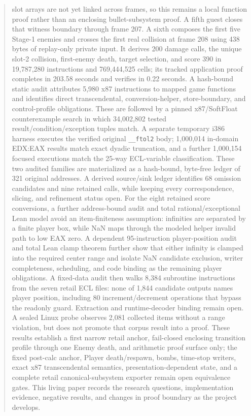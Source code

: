 \documentclass[10pt]{article}
\newcommand{\code}[1]{\texttt{#1}}
\begin{document}
\begin{abstract}
slot arrays are not yet linked across frames, so this remains a local function
proof rather than an enclosing bullet-subsystem proof.  A fifth guest closes
that witness boundary through frame 207.  A sixth composes the first five
Stage-1 enemies and crosses the first real collision at frame 208 using 438
bytes of replay-only private input.  It derives 200 damage calls, the unique
slot-2 collision, first-enemy death, target selection, and score 390 in
19,787,280 instructions and 769,444,525 cells; its tracked application proof
completes in 203.58 seconds and verifies in 0.22 seconds.  A
hash-bound static audit attributes 5,980 x87
instructions to mapped game functions and identifies direct transcendental,
conversion-helper, store-boundary, and control-profile obligations.  These
are followed by a pinned x87/SoftFloat counterexample search in which
34,002,802 tested result/condition/exception tuples match.  A separate
temporary i386 harness executes the verified original \code{\_\_ftol2} body;
1,000,014 in-domain EDX:EAX results match exact dyadic truncation, and a
further 1,000,154 focused executions match the 25-way ECL-variable
classification.  These two audited families are materialized as a hash-bound,
byte-free ledger of 321 original addresses.  A derived source/sink ledger
identifies 68 omission candidates and nine retained calls, while keeping every
correspondence, slicing, and refinement status open.
For the eight retained score conversions, a further address-bound audit and
total rational/exceptional Lean model avoid an item-finiteness assumption:
infinities are separated by a finite player box, while NaN maps through the
modeled helper invalid path to low EAX zero.  A dependent 95-instruction
player-position audit and total Lean clamp theorem further show that either
infinity is clamped into the required center range and isolate NaN candidate
exclusion, writer completeness, scheduling, and code binding as the remaining
player obligations.  A fixed-data audit then walks 8,384 subroutine
instructions from the seven retail ECL files: none of 1,844 candidate outputs
names player position,
including 80 increment/decrement operations that bypass the readonly guard.
Extraction and runtime-decoder binding remain open.  A sealed Linux probe
observes 2,081 collected items without a range violation, but does not promote
that corpus result into a proof.
These results establish a first narrow retail anchor, fail-closed enclosing
transition profile through one Enemy death, and arithmetic proof surface only;
the fixed post-calc anchor, Player death/respawn, bombs, time-stop writers, exact x87
transcendental semantics, presentation-dependent state, and a complete
retail canonical-subsystem exporter remain open equivalence gates.  This living paper
records the research questions, implementation evidence, negative results, and
changes in proof boundary as the project develops.
\end{abstract}
\end{document}
